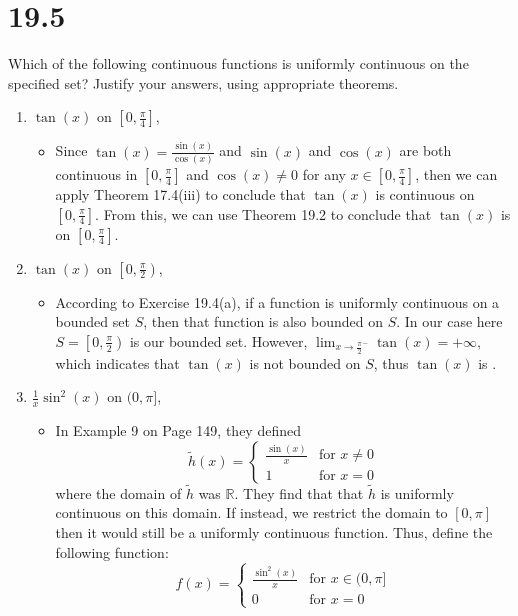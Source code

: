 \documentclass[10pt,a4paper]{article}
\theoremstyle{definition}
\begin{document}
\section*{19.5}
Which of the following continuous functions is uniformly continuous on the specified set? Justify your answers, using appropriate theorems.
\begin{enumerate}[label = (\alph*)]
\item $\tan(x)$ on $\left[0, \frac{\pi}{4}\right]$,
	\begin{itemize}
	\item Since $\tan(x) = \frac{\sin(x)}{\cos(x)}$ and $\sin(x)$ and $\cos(x)$ are both continuous in $\left[0, \frac{\pi}{4}\right]$ and $\cos(x) \neq 0$ for any $x \in \left[0, \frac{\pi}{4}\right]$, then we can apply Theorem 17.4(iii) to conclude that $\tan(x)$ is continuous on $\left[0, \frac{\pi}{4}\right]$. From this, we can use Theorem 19.2 to conclude that $\tan(x)$ is  on $\left[0, \frac{\pi}{4}\right]$.
	\end{itemize}
\item $\tan(x)$ on $\left[0, \frac{\pi}{2}\right)$,
	\begin{itemize}
	\item According to Exercise 19.4(a), if a function is uniformly continuous on a bounded set $S$, then that function is also bounded on $S$. In our case here $S = \left[0, \frac{\pi}{2}\right)$ is our bounded set. However, $\lim_{x \to \frac{\pi}{2}^-}\tan(x) = +\infty$, which indicates that $\tan(x)$ is not bounded on $S$, thus $\tan(x)$ is .
	\end{itemize}
\item $\frac{1}{x}\sin^2(x)$ on $(0, \pi]$,
	\begin{itemize}
	\item In Example 9 on Page 149, they defined 
	\[\tilde{h}(x) = \begin{cases}
	\frac{\sin(x)}{x} &\text{for } x \neq 0\\
	1 &\text{for } x = 0
	\end{cases}\]
	where the domain of $\tilde{h}$ was $\mathbb{R}$. They find that that $\tilde{h}$ is uniformly continuous on this domain. If instead, we restrict the domain to $[0,\pi]$ then it would still be a uniformly continuous function. Thus, define the following function:
	\[f(x) = \begin{cases}
	\frac{\sin^2(x)}{x} &\text{for } x \in (0,\pi]\\
	0 &\text{for } x = 0

\end{cases}\]
\end{itemize}
\end{enumerate}
\end{document}
